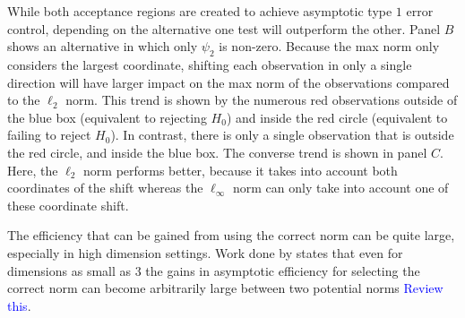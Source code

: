 \documentclass{article}
\newcommand{\vmat}{\Sigma}
\newcommand{\rvv}{Z}
\newcommand{\distv}{Q}
\begin{document}
While both acceptance regions are created to achieve asymptotic type $1$ error control, depending on the alternative one test will outperform the other. Panel $B$ shows an alternative in which only $\psi_2$ is non-zero.  Because the max norm only considers the largest coordinate, shifting each observation in only a single direction will have larger impact on the max norm of the observations compared to the $\ell_2$ norm.  This trend is shown by the numerous red observations outside of the blue box (equivalent to rejecting $H_0$) and inside the red circle (equivalent to failing to reject $H_0$). In contrast, there is only a single observation that is outside the red circle, and inside the blue box. The converse trend is shown in panel $C$. Here, the $\ell_2$ norm performs better, because it takes into account both coordinates of the shift whereas the $\ell_\infty$ norm can only take into account one of these coordinate shift. 

The efficiency that can be gained from using the correct norm can be quite large, especially in high dimension settings.  Work done by \citep{pinelis_schur2-concavity_2014} states that even for dimensions as small as $3$ the gains in asymptotic efficiency for selecting the correct norm can become arbitrarily large between two potential norms \textcolor{blue}{Review this}.  

\end{document}
